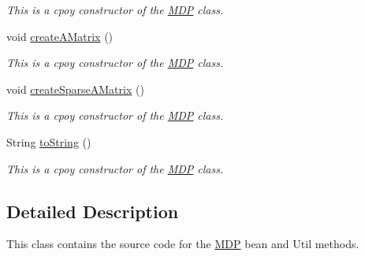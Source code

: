 \begin{DoxyCompactItemize}
\begin{DoxyCompactList}\small\item\em This is a cpoy constructor of the \hyperlink{classese_1_1seas_1_1upenn_1_1edu_1_1_m_d_p}{M\+D\+P} class. \end{DoxyCompactList}\item 
\hypertarget{classese_1_1seas_1_1upenn_1_1edu_1_1_m_d_p_aa2388cc570c1221db8965bd67ebce964}{}void \hyperlink{classese_1_1seas_1_1upenn_1_1edu_1_1_m_d_p_aa2388cc570c1221db8965bd67ebce964}{create\+A\+Matrix} ()\label{classese_1_1seas_1_1upenn_1_1edu_1_1_m_d_p_aa2388cc570c1221db8965bd67ebce964}

\begin{DoxyCompactList}\small\item\em This is a cpoy constructor of the \hyperlink{classese_1_1seas_1_1upenn_1_1edu_1_1_m_d_p}{M\+D\+P} class. \end{DoxyCompactList}\item 
\hypertarget{classese_1_1seas_1_1upenn_1_1edu_1_1_m_d_p_a51c6b56c16b57e8beb6e78f38909ab11}{}void \hyperlink{classese_1_1seas_1_1upenn_1_1edu_1_1_m_d_p_a51c6b56c16b57e8beb6e78f38909ab11}{create\+Sparse\+A\+Matrix} ()\label{classese_1_1seas_1_1upenn_1_1edu_1_1_m_d_p_a51c6b56c16b57e8beb6e78f38909ab11}

\begin{DoxyCompactList}\small\item\em This is a cpoy constructor of the \hyperlink{classese_1_1seas_1_1upenn_1_1edu_1_1_m_d_p}{M\+D\+P} class. \end{DoxyCompactList}\item 
\hypertarget{classese_1_1seas_1_1upenn_1_1edu_1_1_m_d_p_a737a653ca7246055a11983d4e2bbc915}{}String \hyperlink{classese_1_1seas_1_1upenn_1_1edu_1_1_m_d_p_a737a653ca7246055a11983d4e2bbc915}{to\+String} ()\label{classese_1_1seas_1_1upenn_1_1edu_1_1_m_d_p_a737a653ca7246055a11983d4e2bbc915}

\begin{DoxyCompactList}\small\item\em This is a cpoy constructor of the \hyperlink{classese_1_1seas_1_1upenn_1_1edu_1_1_m_d_p}{M\+D\+P} class. \end{DoxyCompactList}\end{DoxyCompactItemize}


\subsection{Detailed Description}
This class contains the source code for the \hyperlink{classese_1_1seas_1_1upenn_1_1edu_1_1_m_d_p}{M\+D\+P} bean and Util methods. 

